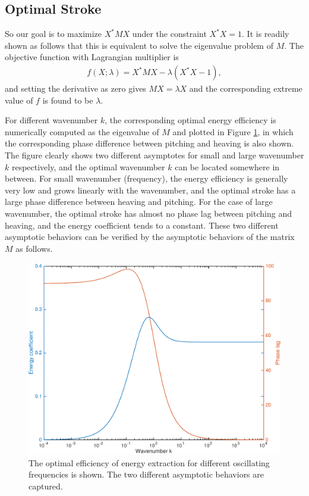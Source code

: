 \subsection{Optimal Stroke}

So our goal is to maximize $X^* M X$ under the constraint $X^* X = 1$.
It is readily shown as follows that this is equivalent to solve the eigenvalue problem of $M$.
The objective function with Lagrangian multiplier is 
\begin{align}
f(X; \lambda) = X^* M X - \lambda (X^* X - 1),
\end{align}
and setting the derivative as zero gives $MX = \lambda X$ and the corresponding extreme value of $f$ is found to be $\lambda$.

For different wavenumber $k$, the corresponding optimal energy efficiency is numerically computed as the eigenvalue of $M$ and plotted in Figure \ref{fig:Theodorsen}, in which the corresponding phase difference between pitching and heaving is also shown.
The figure clearly shows two different asymptotes for small and large wavenumber $k$ respectively, and the optimal wavenumber $k$ can be located somewhere in between.
For small wavenumber (frequency), the energy efficiency is generally very low and grows linearly with the wavenumber, and the optimal stroke has a large phase difference between heaving and pitching.
For the case of large wavenumber, the optimal stroke has almost no phase lag between pitching and heaving, and the energy coefficient tends to a constant.
These two different asymptotic behaviors can be verified by the asymptotic behaviors of the matrix $M$ as follows. 

\begin{figure}
\begin{center}
\includegraphics[width=13cm]{Figures/TheodorsenEnergy.pdf}
\end{center}
\caption[The optimal energy efficiency for different oscillating frequencies of plate]{The optimal efficiency of energy extraction for different oscillating frequencies is shown. The two different asymptotic behaviors are captured.}
\label{fig:Theodorsen}
\end{figure}


